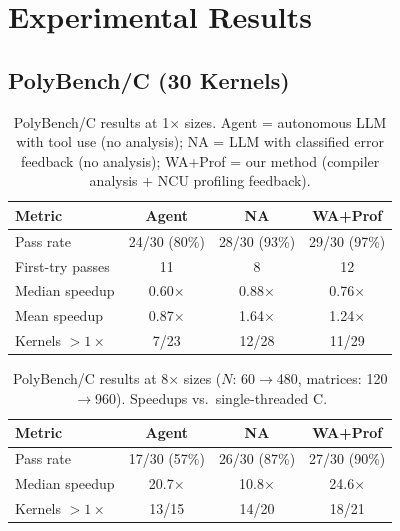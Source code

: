 \section{Experimental Results}
\label{sec:eval}

\subsection{PolyBench/C (30 Kernels)}

\begin{table}[t]
  \caption{PolyBench/C results at 1$\times$ sizes. Agent = autonomous LLM with tool use (no analysis); NA = LLM with classified error feedback (no analysis); WA+Prof = our method (compiler analysis + NCU profiling feedback).}
  \label{tab:results_1x}
  \centering\small
  \begin{tabular}{lccc}
    \toprule
    \textbf{Metric} & \textbf{Agent} & \textbf{NA} & \textbf{WA+Prof} \\
    \midrule
    Pass rate          & 24/30 (80\%) & 28/30 (93\%) & 29/30 (97\%) \\
    First-try passes   & 11           & 8            & 12           \\
    Median speedup     & 0.60$\times$ & 0.88$\times$ & 0.76$\times$ \\
    Mean speedup       & 0.87$\times$ & 1.64$\times$ & 1.24$\times$ \\
    Kernels $>1\times$ & 7/23         & 12/28        & 11/29        \\
    \bottomrule
  \end{tabular}
\end{table}

\begin{table}[t]
  \caption{PolyBench/C results at 8$\times$ sizes ($N$: 60$\to$480, matrices: 120$\to$960). Speedups vs.\ single-threaded C.}
  \label{tab:results_8x}
  \centering\small
  \begin{tabular}{lccc}
    \toprule
    \textbf{Metric} & \textbf{Agent} & \textbf{NA} & \textbf{WA+Prof} \\
    \midrule
    Pass rate          & 17/30 (57\%) & 26/30 (87\%) & 27/30 (90\%) \\
    Median speedup     & 20.7$\times$ & 10.8$\times$ & 24.6$\times$ \\
    Kernels $>1\times$ & 13/15        & 14/20        & 18/21        \\
    \bottomrule
  \end{tabular}
\end{table}


